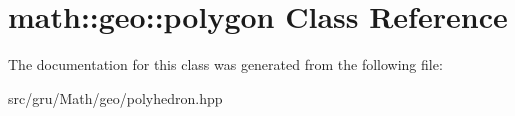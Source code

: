 \hypertarget{classmath_1_1geo_1_1polygon}{\section{math\-:\-:geo\-:\-:polygon \-Class \-Reference}
\label{classmath_1_1geo_1_1polygon}
}


\-The documentation for this class was generated from the following file\-:\begin{DoxyCompactItemize}
\item 
src/gru/\-Math/geo/polyhedron.\-hpp\end{DoxyCompactItemize}
